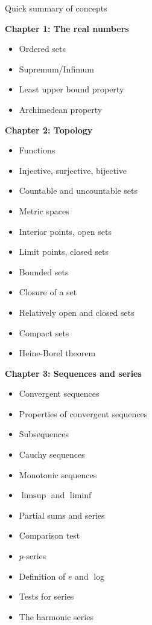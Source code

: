 \documentclass[12pt]{article}
\begin{document}
\begin{center}
Quick summary of concepts
\end{center}

\medskip

\noindent \textbf{Chapter 1: The real numbers}
\begin{itemize}
\item Ordered sets
\item Supremum/Infimum
\item Least upper bound property
\item Archimedean property
\end{itemize}

\noindent \textbf{Chapter 2: Topology}
\begin{itemize}
\item Functions
\item Injective, surjective, bijective
\item Countable and uncountable sets
\item Metric spaces
\item Interior points, open sets
\item Limit points, closed sets
\item Bounded sets
\item Closure of a set
\item Relatively open and closed sets
\item Compact sets
\item Heine-Borel theorem
\end{itemize}

\noindent \textbf{Chapter 3: Sequences and series}
\begin{itemize}
\item Convergent sequences 
\item Properties of convergent sequences
\item Subsequences
\item Cauchy sequences
\item Monotonic sequences
\item $\limsup$ and $\liminf$
\item Partial sums and series
\item Comparison test
\item $p$-series
\item Definition of $e$ and $\log$
\item Tests for series
\item The harmonic series
\end{itemize}
\end{document}
